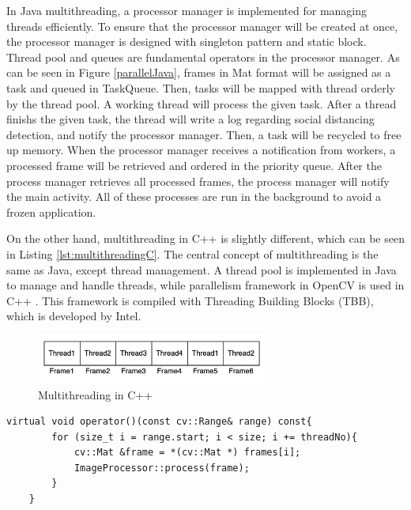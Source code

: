         In Java multithreading, a processor manager is implemented for managing threads efficiently.
        To ensure that the processor manager will be created at once,
        the processor manager is designed with singleton pattern and static block.
        Thread pool and queues are fundamental operators in the processor manager.
        As can be seen in Figure \ref{parallelJava}, frames in Mat format will be assigned as a task and queued in TaskQueue.
        Then, tasks will be mapped with thread orderly by the thread pool.
        A working thread will process the given task.
        After a thread finishs the given task,
        the thread will write a log regarding social distancing detection, and notify the processor manager.
        Then, a task will be recycled to free up memory.
        When the processor manager receives a notification from workers,
        a processed frame will be retrieved and ordered in the priority queue.
        After the process manager retrieves all processed frames,
        the process manager will notify the main activity.
        All of these processes are run in the background to avoid a frozen application.

        On the other hand, multithreading in C++ is slightly different, which can be seen in Listing \ref{lst:multithreadingC}.
        The central concept of multithreading is the same as Java, except thread management.
        A thread pool is implemented in Java to manage and handle threads,
        while parallelism framework in OpenCV is used in C++ \cite{opencv_library}.
        This framework is compiled with Threading Building Blocks (TBB), which is developed by Intel.

        \begin{figure}[!ht]
            \centering
            \includegraphics[width=3in]{images/chapter3/cpp-parallel.png}
            \caption{Multithreading in C++}
            \label{parallelCpp}
        \end{figure}

\begin{lstlisting}[caption={The example of multithreading in C++},captionpos=b,label={lst:multithreadingC}]
    virtual void operator()(const cv::Range& range) const{
        for (size_t i = range.start; i < size; i += threadNo){
            cv::Mat &frame = *(cv::Mat *) frames[i];
            ImageProcessor::process(frame);
        }
    }
\end{lstlisting}

